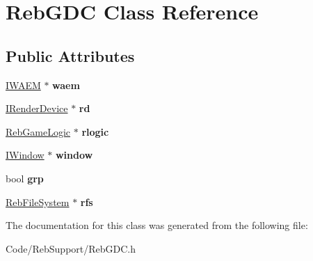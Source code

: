 \hypertarget{class_reb_g_d_c}{}\section{Reb\+G\+DC Class Reference}
\label{class_reb_g_d_c}
\subsection*{Public Attributes}
\begin{DoxyCompactItemize}
\item 
\hyperlink{class_i_w_a_e_m}{I\+W\+A\+EM} $\ast$ {\bfseries waem}\hypertarget{class_reb_g_d_c_a839485e984af193e81d6dcc5e40223c9}{}\label{class_reb_g_d_c_a839485e984af193e81d6dcc5e40223c9}

\item 
\hyperlink{class_i_render_device}{I\+Render\+Device} $\ast$ {\bfseries rd}\hypertarget{class_reb_g_d_c_af25180fbb5b4440d8758369f3ca21264}{}\label{class_reb_g_d_c_af25180fbb5b4440d8758369f3ca21264}

\item 
\hyperlink{class_reb_game_logic}{Reb\+Game\+Logic} $\ast$ {\bfseries rlogic}\hypertarget{class_reb_g_d_c_a1b4baea32b6dae4d7ce62b5f5097ccda}{}\label{class_reb_g_d_c_a1b4baea32b6dae4d7ce62b5f5097ccda}

\item 
\hyperlink{class_i_window}{I\+Window} $\ast$ {\bfseries window}\hypertarget{class_reb_g_d_c_ae5570dfbb9cb688315bf7f532642feb2}{}\label{class_reb_g_d_c_ae5570dfbb9cb688315bf7f532642feb2}

\item 
bool {\bfseries grp}\hypertarget{class_reb_g_d_c_a0c468883aef503f6e9f8cd9697ae7992}{}\label{class_reb_g_d_c_a0c468883aef503f6e9f8cd9697ae7992}

\item 
\hyperlink{class_reb_file_system}{Reb\+File\+System} $\ast$ {\bfseries rfs}\hypertarget{class_reb_g_d_c_a9613fa4261400a3fff835de56b8b2116}{}\label{class_reb_g_d_c_a9613fa4261400a3fff835de56b8b2116}

\end{DoxyCompactItemize}


The documentation for this class was generated from the following file\+:\begin{DoxyCompactItemize}
\item 
Code/\+Reb\+Support/Reb\+G\+D\+C.\+h\end{DoxyCompactItemize}

